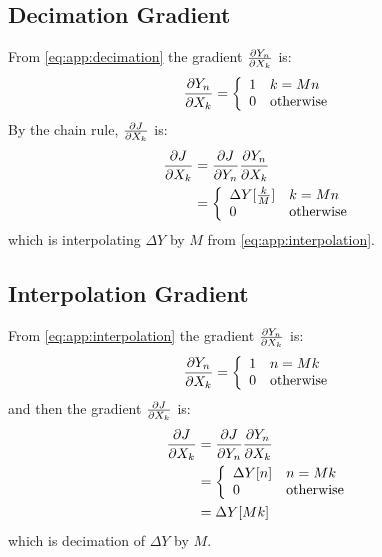 \subsection{Decimation Gradient}
From \eqref{eq:app:decimation} the gradient $\frac{\partial Y_n}{\partial X_k}$ is: 
\begin{equation}
  \frac{\partial Y_n}{\partial X_k} = \left\{ \begin{array}{ll}
    1 & k = Mn \\
    0 & \text{otherwise} \\
  \end{array} \right.
\end{equation}
By the chain rule, $\frac{\partial J}{\partial X_k}$ is:
\begin{align}
  \frac{\partial J}{\partial X_k} &= \frac{\partial J}{\partial Y_n}\frac{\partial Y_n}{\partial X_k} \\
                &= \left\{ \begin{array}{ll} 
                \Delta Y[\frac{k}{M}] & k = Mn\\
                  0 & \text{otherwise} \\
                \end{array}\right.
\end{align}
which is interpolating $\Delta Y$ by $M$ from \eqref{eq:app:interpolation}.

\subsection{Interpolation Gradient}
From \eqref{eq:app:interpolation} the gradient $\frac{\partial Y_n}{\partial X_k}$ is:
\begin{equation}
  \frac{\partial Y_n}{\partial X_k} = \left\{ \begin{array}{ll}
    1 & n = Mk \\
    0 & \text{otherwise}
  \end{array} \right.
\end{equation}
and then the gradient $\frac{\partial J}{\partial X_k}$ is:
\begin{align}
  \frac{\partial J}{\partial X_k} &= \frac{\partial J}{\partial Y_n}\frac{\partial Y_n}{\partial X_k} \\
                &= \left\{ \begin{array}{ll} 
                \Delta Y[n] & n = Mk\\
                  0 & \text{otherwise} 
                \end{array}\right. \\
                &= \Delta Y[Mk]
\end{align}
which is decimation of $\Delta Y$ by $M$.
 
